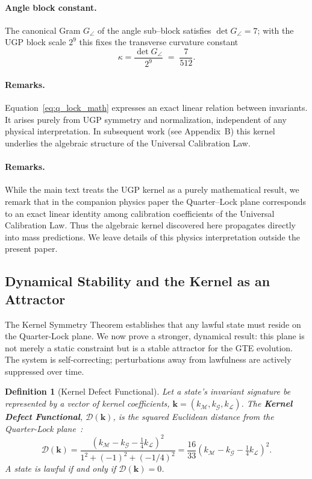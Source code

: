 \documentclass[12pt]{article}
\newtheorem{definition}[theorem]{Definition}
\numberwithin{equation}{section}
\newcommand{\M}{\mathcal{M}}
\newcommand{\G}{\mathcal{G}}
\newcommand{\LL}{\mathcal{L}}
\begin{document}
\paragraph{Angle block constant.}
The canonical Gram $G_{\angle}$ of the angle sub–block
satisfies $\det G_{\angle}=7$;
with the UGP block scale $2^9$
this fixes the transverse curvature constant
\[
\kappa = \frac{\det G_{\angle}}{2^9} \;=\; \frac{7}{512}.
\]

\paragraph{Remarks.}
Equation~\eqref{eq:q_lock_math} expresses an exact linear relation
between invariants.
It arises purely from UGP symmetry and normalization,
independent of any physical interpretation.
In subsequent work (see Appendix~B)
this kernel underlies the algebraic structure of the
Universal Calibration Law.

\paragraph{Remarks.}
While the main text treats the UGP kernel as a purely mathematical result,
we remark that in the companion physics paper
the Quarter–Lock plane corresponds to an exact linear identity
among calibration coefficients of the Universal Calibration Law.
Thus the algebraic kernel discovered here
propagates directly into mass predictions.
We leave details of this physics interpretation outside the present paper.

\subsection{Dynamical Stability and the Kernel as an Attractor}
The Kernel Symmetry Theorem establishes that any lawful state must reside on the Quarter-Lock plane. We now prove a stronger, dynamical result: this plane is not merely a static constraint but is a stable attractor for the GTE evolution. The system is self-correcting; perturbations away from lawfulness are actively suppressed over time.

\begin{definition}[Kernel Defect Functional]
Let a state's invariant signature be represented by a vector of kernel coefficients, $\mathbf{k} = (k_{\M}, k_{\G}, k_{\LL})$. The \textbf{Kernel Defect Functional}, $\mathcal{D}(\mathbf{k})$, is the squared Euclidean distance from the Quarter-Lock plane~\cite{SpivackUGPFormalization,ugp-lean}:
\begin{equation}
    \mathcal{D}(\mathbf{k}) = \frac{(k_{\M} - k_{\G} - \tfrac{1}{4}k_{\LL})^2}{1^2 + (-1)^2 + (-1/4)^2} = \frac{16}{33}(k_{\M} - k_{\G} - \tfrac{1}{4}k_{\LL})^2.
\end{equation}
A state is lawful if and only if $\mathcal{D}(\mathbf{k}) = 0$.
\end{definition}
\end{document}
